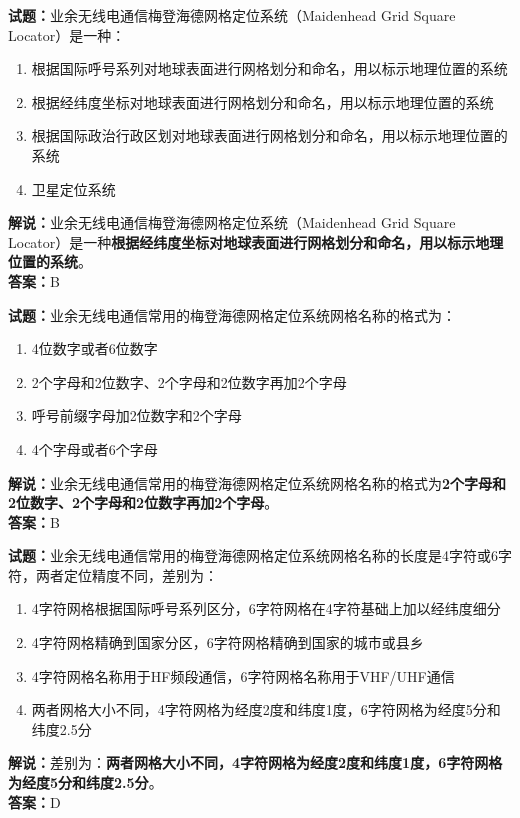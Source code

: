 \documentclass{ctexbook}
\begin{document}
\bigskip


\noindent\textbf{试题：}业余无线电通信梅登海德网格定位系统（Maidenhead Grid Square Locator）是一种：
\begin{enumerate}[leftmargin=3em]
\item 根据国际呼号系列对地球表面进行网格划分和命名，用以标示地理位置的系统
\item 根据经纬度坐标对地球表面进行网格划分和命名，用以标示地理位置的系统
\item 根据国际政治行政区划对地球表面进行网格划分和命名，用以标示地理位置的系统
\item 卫星定位系统
\end{enumerate}
\noindent\textbf{解说：}业余无线电通信梅登海德网格定位系统（Maidenhead Grid Square Locator）是一种\textbf{根据经纬度坐标对地球表面进行网格划分和命名，用以标示地理位置的系统}。\\\noindent\textbf{答案：}B



\bigskip


\noindent\textbf{试题：}业余无线电通信常用的梅登海德网格定位系统网格名称的格式为：
\begin{enumerate}[leftmargin=3em]
\item 4位数字或者6位数字
\item 2个字母和2位数字、2个字母和2位数字再加2个字母
\item 呼号前缀字母加2位数字和2个字母
\item 4个字母或者6个字母
\end{enumerate}
\noindent\textbf{解说：}业余无线电通信常用的梅登海德网格定位系统网格名称的格式为\textbf{2个字母和2位数字、2个字母和2位数字再加2个字母}。\\\noindent\textbf{答案：}B




\bigskip


\noindent\textbf{试题：}业余无线电通信常用的梅登海德网格定位系统网格名称的长度是4字符或6字符，两者定位精度不同，差别为：
\begin{enumerate}[leftmargin=3em]
\item 4字符网格根据国际呼号系列区分，6字符网格在4字符基础上加以经纬度细分
\item 4字符网格精确到国家分区，6字符网格精确到国家的城市或县乡
\item 4字符网格名称用于HF频段通信，6字符网格名称用于VHF/UHF通信
\item 两者网格大小不同，4字符网格为经度2度和纬度1度，6字符网格为经度5分和纬度2.5分
\end{enumerate}
\noindent\textbf{解说：}差别为：\textbf{两者网格大小不同，4字符网格为经度2度和纬度1度，6字符网格为经度5分和纬度2.5分}。\\\noindent\textbf{答案：}D
\end{document}
